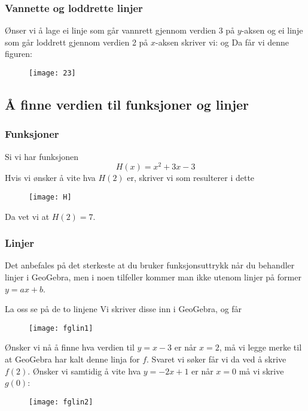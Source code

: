 \subsubsection{Vannette og loddrette linjer}

Ønser vi å lage ei linje som går vannrett gjennom verdien 3 på $ y $-aksen og ei linje som går loddrett gjennom verdien 2 på $ x $-aksen skriver vi:
og 
Da får vi denne figuren:
\begin{figure}[H]
	\centering
	\texttt{[image: 23]}
\end{figure}

\subsection{Å finne verdien til funksjoner og linjer}
\subsubsection{Funksjoner}
Si vi har funksjonen
\[H(x)= x^2 + 3x -3 \]
Hvis vi ønsker å vite hva $ H(2) $ er, skriver vi
som resulterer i dette
\begin{figure}[H]
	\centering
	\texttt{[image: H]}
\end{figure}
Da vet vi at $ H(2)=7 $.
\subsubsection{Linjer}
Det anbefales på det sterkeste at du bruker funksjonsuttrykk når du behandler linjer i GeoGebra, men i noen tilfeller kommer man ikke utenom linjer på former $ y=ax+b $. \vsk

La oss se på de to linjene \vs
{}
Vi skriver disse inn i GeoGebra, og får
\begin{figure}[H]
	\centering
	\texttt{[image: fglin1]}
\end{figure}
Ønsker vi nå å finne hva verdien til $ {y=x-3} $ er når $ {x=2} $, må vi legge merke til at GeoGebra har kalt denne linja for $ f $. Svaret vi søker får vi da ved å skrive $ f(2) $. Ønsker vi samtidig å vite hva $ {y=-2x+1} $ er når $ {x=0} $ må vi skrive $ g(0) $:
\begin{figure}[H]
	\centering
	\texttt{[image: fglin2]}
\end{figure}

\newpage
